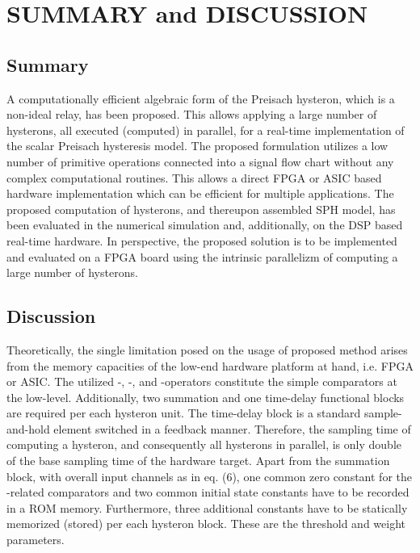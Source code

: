 \documentclass[journal]{IEEEtran}
\begin{document}
\section{SUMMARY and DISCUSSION}
\label{sec:4}

\subsection{Summary}

A computationally efficient algebraic form of the Preisach
hysteron, which is a non-ideal relay, has been proposed. This
allows applying a large number of hysterons, all executed
(computed) in parallel, for a real-time implementation of the
scalar Preisach hysteresis model. The proposed formulation
utilizes a low number of primitive operations connected into a
signal flow chart without any complex computational routines. This
allows a direct FPGA or ASIC based hardware implementation which
can be efficient for multiple applications. The proposed
computation of hysterons, and thereupon assembled SPH model, has
been evaluated in the numerical simulation and, additionally, on
the DSP based real-time hardware. In perspective, the proposed
solution is to be implemented and evaluated on a FPGA board using
the intrinsic parallelizm of computing a large number of
hysterons.

\subsection{Discussion}

Theoretically, the single limitation posed on the usage of
proposed method arises from the memory capacities of the low-end
hardware platform at hand, i.e. FPGA or ASIC. The utilized
-, -, and -operators constitute the
simple comparators at the low-level. Additionally, two summation
and one time-delay functional blocks are required per each
hysteron unit. The time-delay block is a standard sample-and-hold
element switched in a feedback manner. Therefore, the sampling
time of computing a hysteron, and consequently all hysterons in
parallel, is only double of the base sampling time of the hardware
target. Apart from the summation block, with overall  input
channels as in eq. (6), one common zero constant for the
-related comparators and two common initial state
constants  have to be recorded in a ROM memory.
Furthermore, three additional constants have to be statically
memorized (stored) per each hysteron block. These are the
threshold and weight parameters.
\end{document}
